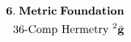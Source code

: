 \documentclass[preview]{standalone}
\begin{document}
\begin{align*}
\special{dvisvgm:raw <g id='unique000'>}\mathbf{6.\;Metric\;Foundation}\\36\text{-Comp Hermetry }{}^2\bar{\mathbf{g}}\special{dvisvgm:raw </g>}
\end{align*}
\end{document}
